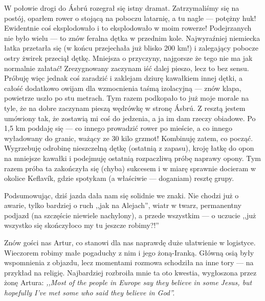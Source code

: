 W połowie drogi do Ásbrú rozegrał się istny dramat. Zatrzymaliśmy się na postój, oparłem rower o stojącą na poboczu latarnię, a tu nagle --- potężny huk! Ewidentnie coś eksplodowało i to eksplodowało w moim rowerze! Podejrzanych nie było wielu --- to znów feralna dętka w przednim kole. Najwyraźniej niemiecka łatka przetarła się (w końcu przejechała już blisko 200 km!) i zalegający pobocze ostry żwirek przeciął dętkę. Mniejsza o przyczyny, najgorsze że tego nie ma jak normalnie załatać! Zrezygnowany zaczynam iść dalej pieszo, lecz to bez sensu. Próbuję więc jednak coś zaradzić i zaklejam dziurę kawałkiem innej dętki, a całość dodatkowo owijam dla wzmocnienia taśmą izolacyjną --- znów klapa, powietrze uszło po stu metrach. Tym razem podkopało to już moje morale na tyle, że na dobre zaczynam pieszą wędrówkę w stronę Ásbrú. Z resztą jestem umówiony tak, że zostawią mi coś do jedzenia, a ja im dam rzeczy obiadowe. Po 1,5 km poddaję się --- co innego prowadzić rower po mieście, a co innego wyładowany do granic, ważący ze 30 kilo grzmot! Kombinuję zatem, co począć. Wygrzebuję odrobinę nieszczelną dętkę (ostatnią z zapasu), kroję łatkę do opon na mniejsze kawałki i podejmuję ostatnią rozpaczliwą próbę naprawy opony. Tym razem próba ta zakończyła się (chyba) sukcesem i w miarę sprawnie docieram w okolice Keflavík, gdzie spotykam (a właściwie --- doganiam) resztę grupy.

Podsumowując, dziś jazda dała nam się solidnie we znaki. Nie chodzi już o awarie, tylko bardziej o ruch ,,jak na Alejach'', wiatr w twarz, permanentny podjazd (na szczęście niewiele nachylony), a przede wszystkim --- o uczucie ,,już wszystko się skończyło\textellipsis co my tu jeszcze robimy?!''

Znów gości nas Artur, co stanowi dla nas naprawdę duże ułatwienie w logistyce. Wieczorem robimy małe pogaduchy z nim i jego żoną-Iranką. Główną osią były wspomnienia z objazdu, lecz momentami rozmowa schodziła na inne tory --- na przykład na religię. Najbardziej rozbroiła mnie ta oto kwestia, wygłoszona przez żonę Artura: \emph{,,Most of the people in Europe say they believe in some Jesus, but hopefully I’ve met some who said they believe in God''.}

